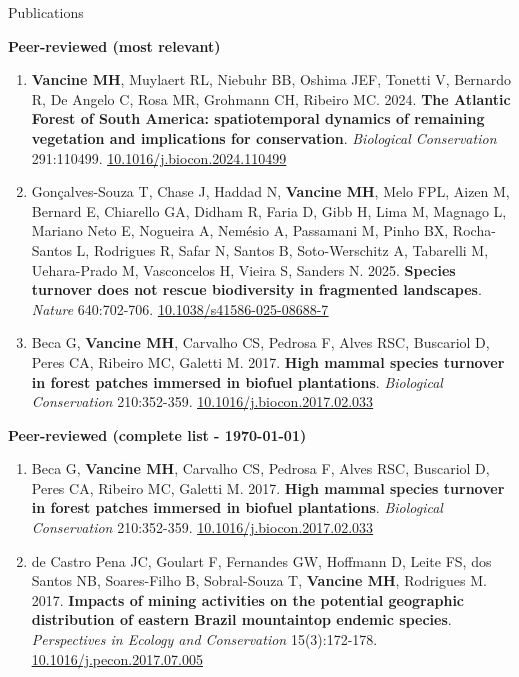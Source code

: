 \documentclass{resume}
\begin{document}
\begin{rSection}{Publications}

\textbf{Peer-reviewed (most relevant)}

\begin{enumerate} 

\item \textbf{Vancine MH}, Muylaert RL, Niebuhr BB, Oshima JEF, Tonetti V, Bernardo R, De Angelo C, Rosa MR, Grohmann CH, Ribeiro MC. 2024. \textbf{The Atlantic Forest of South America: spatiotemporal dynamics of remaining vegetation and implications for conservation}. \textit{Biological Conservation} 291:110499. \href{https://doi.org/10.1016/j.biocon.2024.110499}{\underline{10.1016/j.biocon.2024.110499}}

\item Gonçalves-Souza T, Chase J, Haddad N, \textbf{Vancine MH}, Melo FPL, Aizen M, Bernard E, Chiarello GA, Didham R, Faria D, Gibb H, Lima M, Magnago L, Mariano Neto E, Nogueira A, Nemésio A, Passamani M, Pinho BX, Rocha-Santos L, Rodrigues R, Safar N, Santos B, Soto-Werschitz A, Tabarelli M, Uehara-Prado M, Vasconcelos H, Vieira S, Sanders N. 2025. \textbf{Species turnover does not rescue biodiversity in fragmented landscapes}. \textit{Nature} 640:702-706. \href{https://doi.org/10.1038/s41586-025-08688-7}{\underline{10.1038/s41586-025-08688-7}}

\item Beca G, \textbf{Vancine MH}, Carvalho CS, Pedrosa F, Alves RSC, Buscariol D, Peres CA, Ribeiro MC, Galetti M. 2017. \textbf{High mammal species turnover in forest patches immersed in biofuel plantations}. \textit{Biological Conservation} 210:352-359. \href{https://doi.org/10.1016/j.biocon.2017.02.033}{\underline{10.1016/j.biocon.2017.02.033}}

\end{enumerate} 

\textbf{Peer-reviewed (complete list - \today)}

\begin{enumerate} 
\item Beca G, \textbf{Vancine MH}, Carvalho CS, Pedrosa F, Alves RSC, Buscariol D, Peres CA, Ribeiro MC, Galetti M. 2017. \textbf{High mammal species turnover in forest patches immersed in biofuel plantations}. \textit{Biological Conservation} 210:352-359. \href{https://doi.org/10.1016/j.biocon.2017.02.033}{\underline{10.1016/j.biocon.2017.02.033}}

\item de Castro Pena JC, Goulart F, Fernandes GW, Hoffmann D, Leite FS, dos Santos NB, Soares-Filho B, Sobral-Souza T, \textbf{Vancine MH}, Rodrigues M. 2017. \textbf{Impacts of mining activities on the potential geographic distribution of eastern Brazil mountaintop endemic species}. \textit{Perspectives in Ecology and Conservation} 15(3):172-178. \href{https://doi.org/10.1016/j.pecon.2017.07.005}{\underline{10.1016/j.pecon.2017.07.005}}


\end{enumerate}
\end{rSection}
\end{document}
